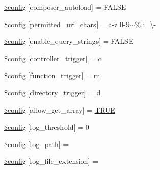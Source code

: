 \begin{DoxyCompactItemize}
\item 
\mbox{\hyperlink{application_2config_2config_8php_af175f69a791ec78be5bc6c6ecf6176e9}{\$config}} \mbox{[}\textquotesingle{}composer\+\_\+autoload\textquotesingle{}\mbox{]} = F\+A\+L\+SE
\item 
\mbox{\hyperlink{application_2config_2config_8php_a0f3f7fc5dfe7ae9b96622df2858a6c5b}{\$config}} \mbox{[}\textquotesingle{}permitted\+\_\+uri\+\_\+chars\textquotesingle{}\mbox{]} = \textquotesingle{}\mbox{\hyperlink{interfacea}{a}}-\/z 0-\/9$\sim$\%.\+:\+\_\+\textbackslash{}-\/\textquotesingle{}
\item 
\mbox{\hyperlink{application_2config_2config_8php_ae0af4957b94a8e97908013d8a34b2d58}{\$config}} \mbox{[}\textquotesingle{}enable\+\_\+query\+\_\+strings\textquotesingle{}\mbox{]} = F\+A\+L\+SE
\item 
\mbox{\hyperlink{application_2config_2config_8php_af1ca04d83f60b351122bdcc8933df731}{\$config}} \mbox{[}\textquotesingle{}controller\+\_\+trigger\textquotesingle{}\mbox{]} = \textquotesingle{}\mbox{\hyperlink{classc}{c}}\textquotesingle{}
\item 
\mbox{\hyperlink{application_2config_2config_8php_aed9f24c6600958d9d55acc35c1a2fbfb}{\$config}} \mbox{[}\textquotesingle{}function\+\_\+trigger\textquotesingle{}\mbox{]} = \textquotesingle{}m\textquotesingle{}
\item 
\mbox{\hyperlink{application_2config_2config_8php_aca523de0098516b35bc5fa68ce13962f}{\$config}} \mbox{[}\textquotesingle{}directory\+\_\+trigger\textquotesingle{}\mbox{]} = \textquotesingle{}d\textquotesingle{}
\item 
\mbox{\hyperlink{application_2config_2config_8php_ad899b5e4fb9873f8afcc93e4c788e11c}{\$config}} \mbox{[}\textquotesingle{}allow\+\_\+get\+\_\+array\textquotesingle{}\mbox{]} = \mbox{\hyperlink{constants_8php_ae04a3efe6aa42044f803ee90c2277846}{T\+R\+UE}}
\item 
\mbox{\hyperlink{application_2config_2config_8php_a1a167c2cf5bc9b35df3e8b47957dfe33}{\$config}} \mbox{[}\textquotesingle{}log\+\_\+threshold\textquotesingle{}\mbox{]} = 0
\item 
\mbox{\hyperlink{application_2config_2config_8php_a992a95ce2e2dc83a6a443d4828ea49f8}{\$config}} \mbox{[}\textquotesingle{}log\+\_\+path\textquotesingle{}\mbox{]} = \textquotesingle{}\textquotesingle{}
\item 
\mbox{\hyperlink{application_2config_2config_8php_a5dc1bfe6bafc81ab1f5fc8f5b2b3bc0c}{\$config}} \mbox{[}\textquotesingle{}log\+\_\+file\+\_\+extension\textquotesingle{}\mbox{]} = \textquotesingle{}\textquotesingle{}

\end{DoxyCompactItemize}
